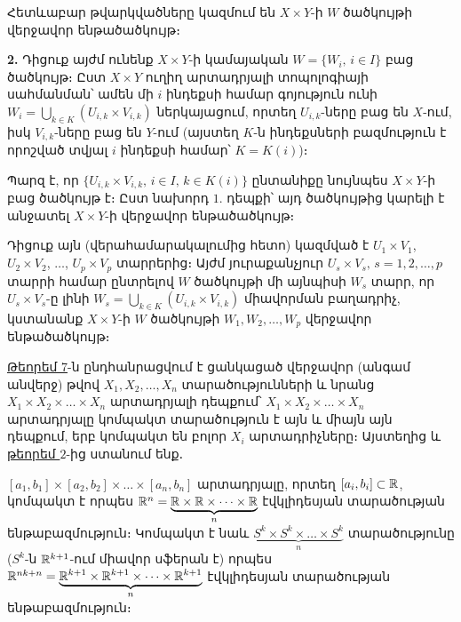 \documentclass[./main.tex]{subfiles}
\begin{document}
\begin{varproof}
\par Հետևաբար թվարկվածները կազմում են $X \times Y$-ի $W$ ծածկույթի վերջավոր են\-թա\-ծածկույթ։

\par \textbf{2.} Դիցուք այժմ ունենք $X\times Y$-ի կամայական $W=\{ W_i,\, i\in I\}$ բաց ծածկույթ։ Ըստ $X\times Y$ ուղիղ արտադրյալի տոպոլոգիայի սահմանման՝ ամեն մի $i$ ինդեքսի համար գոյություն ունի $W_i=\bigcup\limits_{k\in K}(U_{i,k}\times V_{i,k})$ ներկայացում, որտեղ $U_{i,k}$-ները բաց են $X$-ում, իսկ $V_{i,k}$-ները բաց են $Y$-ում (այստեղ $K$-ն ինդեքսների բազմություն է որոշված տվյալ $i$ ինդեքսի համար՝ $K=K(i)$)։
\par Պարզ է, որ $\{U_{i,k}\times V_{i,k},\, i\in I,\, k\in K(i)\}$ ընտանիքը նույնպես $X\times Y$-ի բաց ծածկույթ է։ Ըստ նախորդ $1.$ դեպքի՝ այդ ծածկույթից կարելի է անջատել $X\times Y$-ի վերջավոր ենթածածկույթ։ 
\par Դիցուք այն (վերահամարակալումից հետո) կազմված է $U_1\times V_1$, $U_2\times V_2$, $\dots$, ${U_p\times V_p}$ տարրերից։ Այժմ յուրաքանչյուր $U_s\times V_s,\, s=1,2,\dots,p$ տարրի համար ընտ\-րե\-լով $W$ ծածկույթի մի այնպիսի $W_s$ տարր, որ $U_s\times V_s$-ը լինի ${W_s=\bigcup\limits_{k\in K}(U_{i,k}\times V_{i,k})}$ միա\-վորման բաղադրիչ, կստանանք $X\times Y$-ի $W$ ծածկույթի $W_1, W_2, \dots, W_p$ վեր\-ջա\-վոր ենթածածկույթ։
\end{varproof}

\par \hyperref[թեորեմ 7]{Թեորեմ 7}-ն ընդհանրացվում է ցանկացած վերջավոր (անգամ անվերջ) թվով $X_1,X_2,\dots,X_n$ տարածությունների և նրանց $X_1\times X_2\times \dots\times X_n $ արտադրյալի դեպքում՝ $X_1\times X_2\times \dots\times X_n$ արտադրյալը կոմպակտ տարածություն է այն և միայն այն դեպքում, երբ կոմպակտ են բոլոր $X_i$ արտադրիչները։ Այստեղից և \hyperref[թեորեմ 2]{թեորեմ $2$}-ից ստանում ենք․
\begin{hetevanq}\label{ch17cor4}
$[a_1,b_1]\times [a_2,b_2]\times \dots \times [a_n,b_n]$ արտադրյալը, որտեղ $[a_i,b_i]\subset \mathbb{R}$, կոմպակտ է որպես $\mathbb{R}^n=\underbrace{\mathbb{R}\times \mathbb{R} \times \dots \times \mathbb{R}}_\text{$n$}$ էվկլիդեսյան տարածության են\-թա\-բազ\-մու\-թյուն։ Կոմպակտ է նաև  $\underbrace{S^k\times S^k\times\dots\times S^k}_\text{$n$}$ տարածությունը ($S^k$-ն $\mathbb{R}^{k+1}$-ում մի\-ա\-վոր սֆե\-րան է) որպես $\mathbb{R}^{nk+n}=\underbrace{\mathbb{R}^{k+1}\times \mathbb{R}^{k+1}\times \dots \times \mathbb{R}^{k+1}}_\text{$n$}$ էվկլիդեսյան տա\-րա\-ծու\-թյան ենթաբազմություն։
\end{hetevanq}
\end{document}
